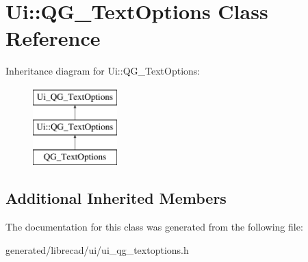 \hypertarget{classUi_1_1QG__TextOptions}{\section{Ui\-:\-:Q\-G\-\_\-\-Text\-Options Class Reference}
\label{classUi_1_1QG__TextOptions}
}
Inheritance diagram for Ui\-:\-:Q\-G\-\_\-\-Text\-Options\-:\begin{figure}[H]
\begin{center}
\leavevmode
\includegraphics[height=3.000000cm]{classUi_1_1QG__TextOptions}
\end{center}
\end{figure}
\subsection*{Additional Inherited Members}


The documentation for this class was generated from the following file\-:\begin{DoxyCompactItemize}
\item 
generated/librecad/ui/ui\-\_\-qg\-\_\-textoptions.\-h\end{DoxyCompactItemize}
